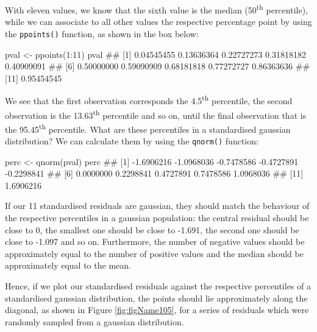 \documentclass[a4paper,12pt,oneside]{book}
\newenvironment{Shaded}{\begin{snugshade}}{\end{snugshade}}
\newcommand{\DecValTok}[1]{#1}
\newcommand{\SpecialCharTok}[1]{#1}
\newcommand{\DocumentationTok}[1]{#1}
\newcommand{\OtherTok}[1]{#1}
\newcommand{\FunctionTok}[1]{#1}
\newcommand{\NormalTok}[1]{#1}
\begin{document}
With eleven values, we know that the sixth value is the median (50\textsuperscript{th} percentile), while we can associate to all other values the respective percentage point by using the \texttt{ppoints()} function, as shown in the box below:

\begin{Shaded}
\begin{Highlighting}[]
\NormalTok{pval }\OtherTok{\textless{}{-}} \FunctionTok{ppoints}\NormalTok{(}\DecValTok{1}\SpecialCharTok{:}\DecValTok{11}\NormalTok{)}
\NormalTok{pval}
\DocumentationTok{\#\#  [1] 0.04545455 0.13636364 0.22727273 0.31818182 0.40909091}
\DocumentationTok{\#\#  [6] 0.50000000 0.59090909 0.68181818 0.77272727 0.86363636}
\DocumentationTok{\#\# [11] 0.95454545}
\end{Highlighting}
\end{Shaded}

We see that the first observation corresponds the 4.5\textsuperscript{th} percentile, the second observation is the 13.63\textsuperscript{th} percentile and so on, until the final observation that is the 95.45\textsuperscript{th} percentile. What are these percentiles in a standardised gaussian distribution? We can calculate them by using the \texttt{qnorm()} function:

\begin{Shaded}
\begin{Highlighting}[]
\NormalTok{perc }\OtherTok{\textless{}{-}} \FunctionTok{qnorm}\NormalTok{(pval)}
\NormalTok{perc}
\DocumentationTok{\#\#  [1] {-}1.6906216 {-}1.0968036 {-}0.7478586 {-}0.4727891 {-}0.2298841}
\DocumentationTok{\#\#  [6]  0.0000000  0.2298841  0.4727891  0.7478586  1.0968036}
\DocumentationTok{\#\# [11]  1.6906216}
\end{Highlighting}
\end{Shaded}

If our 11 standardised residuals are gaussian, they should match the behaviour of the respective percentiles in a gaussian population: the central residual should be close to 0, the smallest one should be close to -1.691, the second one should be close to -1.097 and so on. Furthermore, the number of negative values should be approximately equal to the number of positive values and the median should be approximately equal to the mean.

Hence, if we plot our standardised residuals against the respective percentiles of a standardised gaussian distribution, the points should lie approximately along the diagonal, as shown in Figure \ref{fig:figName105}, for a series of residuals which were randomly sampled from a gaussian distribution.
\end{document}
